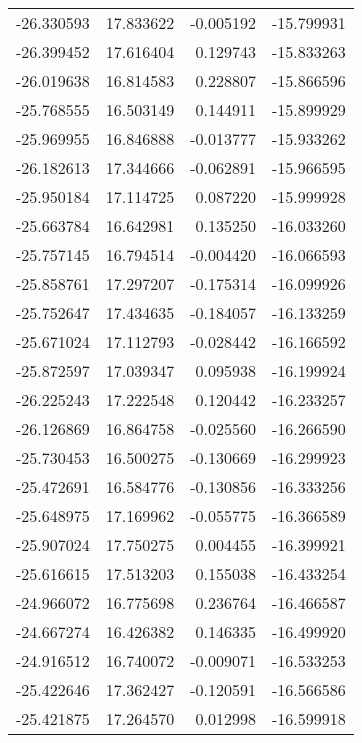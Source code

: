 \begin{tabular}{rrrr}
      -26.330593 &        17.833622 &   -0.005192 & -15.799931 \\
      -26.399452 &        17.616404 &    0.129743 & -15.833263 \\
      -26.019638 &        16.814583 &    0.228807 & -15.866596 \\
      -25.768555 &        16.503149 &    0.144911 & -15.899929 \\
      -25.969955 &        16.846888 &   -0.013777 & -15.933262 \\
      -26.182613 &        17.344666 &   -0.062891 & -15.966595 \\
      -25.950184 &        17.114725 &    0.087220 & -15.999928 \\
      -25.663784 &        16.642981 &    0.135250 & -16.033260 \\
      -25.757145 &        16.794514 &   -0.004420 & -16.066593 \\
      -25.858761 &        17.297207 &   -0.175314 & -16.099926 \\
      -25.752647 &        17.434635 &   -0.184057 & -16.133259 \\
      -25.671024 &        17.112793 &   -0.028442 & -16.166592 \\
      -25.872597 &        17.039347 &    0.095938 & -16.199924 \\
      -26.225243 &        17.222548 &    0.120442 & -16.233257 \\
      -26.126869 &        16.864758 &   -0.025560 & -16.266590 \\
      -25.730453 &        16.500275 &   -0.130669 & -16.299923 \\
      -25.472691 &        16.584776 &   -0.130856 & -16.333256 \\
      -25.648975 &        17.169962 &   -0.055775 & -16.366589 \\
      -25.907024 &        17.750275 &    0.004455 & -16.399921 \\
      -25.616615 &        17.513203 &    0.155038 & -16.433254 \\
      -24.966072 &        16.775698 &    0.236764 & -16.466587 \\
      -24.667274 &        16.426382 &    0.146335 & -16.499920 \\
      -24.916512 &        16.740072 &   -0.009071 & -16.533253 \\
      -25.422646 &        17.362427 &   -0.120591 & -16.566586 \\
      -25.421875 &        17.264570 &    0.012998 & -16.599918 \\

\end{tabular}
